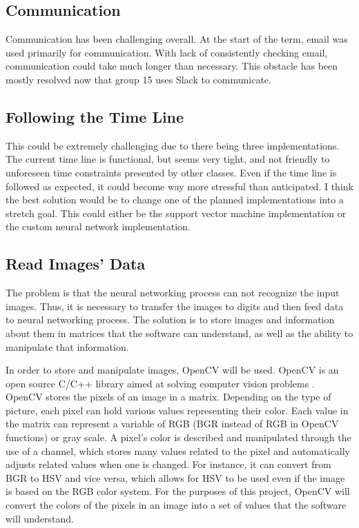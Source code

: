 \documentclass[10pt,journal,compsoc, draftclsnofoot,onecolumn]{IEEEtran}
\begin{document}
\subsection{Communication}
\noindent
Communication has been challenging overall.
At the start of the term, email was used primarily for communication.
With lack of consistently checking email, communication could take much longer than necessary.
This obstacle has been mostly resolved now that group 15 uses Slack to communicate.


\subsection{Following the Time Line}
\noindent
This could be extremely challenging due to there being three implementations.
The current time line is functional, but seems very tight, and not friendly to unforeseen time constraints presented by other classes.
Even if the time line is followed as expected, it could become way more stressful than anticipated.
I think the best solution would be to change one of the planned implementations into a stretch goal.
This could either be the support vector machine implementation or the custom neural network implementation.


\subsection{Read Images' Data}
\noindent
The problem is that the neural networking process can not recognize the input images.
Thus, it is necessary to transfer the images to digits and then feed data to neural networking process.
The solution is to store images and information about them in matrices that the software can understand, as well as the ability to manipulate that information.

\noindent 
In order to store and manipulate images, OpenCV will be used.
OpenCV is an open source C/C++ library aimed at solving computer vision problems \cite{1:online}.
OpenCV stores the pixels of an image in a matrix.
Depending on the type of picture, each pixel can hold various values representing their color.
Each value in the matrix can represent a variable of RGB (BGR instead of RGB in OpenCV functions) or gray scale.
A pixel's color is described and manipulated through the use of a channel, which stores many values related to the pixel and automatically adjusts related values when one is changed.
For instance, it can convert from BGR to HSV and vice versa, which allows for HSV to be used even if the image is based on the RGB color system.
For the purposes of this project, OpenCV will convert the colors of the pixels in an image into a set of values that the software will understand.
\end{document}
